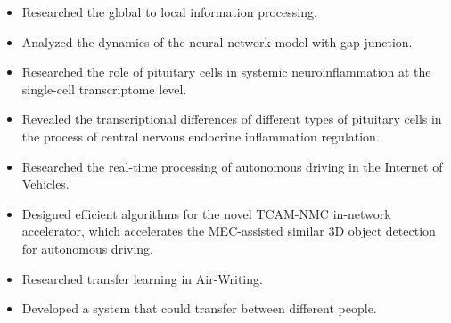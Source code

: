 \documentclass{resume}
\begin{document}
\begin{itemize}[parsep=0.2ex]
  \item Researched the global to local information processing.
  \item Analyzed the dynamics of the neural network model with gap junction.
\end{itemize}
\begin{itemize}[parsep=0.2ex]
  \item Researched the role of pituitary cells in systemic neuroinflammation at the single-cell transcriptome level.
  \item Revealed the transcriptional differences of different types of pituitary cells in the process of central nervous endocrine inflammation regulation.
\end{itemize}
\begin{itemize}[parsep=0.2ex]
  \item Researched the real-time processing of autonomous driving in the Internet of Vehicles.
  \item Designed efficient algorithms for the novel TCAM-NMC in-network accelerator, which accelerates the MEC-assisted similar 3D object detection for autonomous driving.
\end{itemize}
\begin{itemize}[parsep=0.2ex]
  \item Researched transfer learning in Air-Writing.
  \item Developed a system that could transfer between different people.
\end{itemize}
\end{document}

